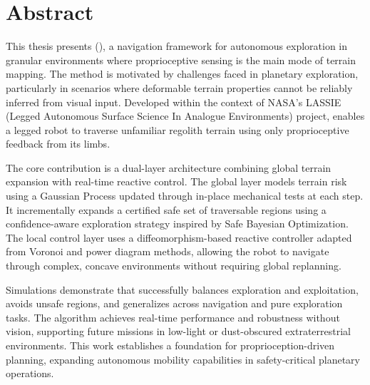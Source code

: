 \chapter*{Abstract}
\label{chap:Abstract}

This thesis presents \algonamefull{} (\algoname{}), a navigation framework for autonomous exploration in granular environments where proprioceptive sensing is the main mode of terrain mapping. The method is motivated by challenges faced in planetary exploration, particularly in scenarios where deformable terrain properties cannot be reliably inferred from visual input. Developed within the context of NASA’s LASSIE (Legged Autonomous Surface Science In Analogue Environments) project, \algoname{} enables a legged robot to traverse unfamiliar regolith terrain using only proprioceptive feedback from its limbs.

The core contribution is a dual-layer architecture combining global terrain expansion with real-time reactive control. The global layer models terrain risk using a Gaussian Process updated through in-place mechanical tests at each step. It incrementally expands a certified safe set of traversable regions using a confidence-aware exploration strategy inspired by Safe Bayesian Optimization. The local control layer uses a diffeomorphism-based reactive controller adapted from Voronoi and power diagram methods, allowing the robot to navigate through complex, concave environments without requiring global replanning.

Simulations demonstrate that \algoname{} successfully balances exploration and exploitation, avoids unsafe regions, and generalizes across navigation and pure exploration tasks. The algorithm achieves real-time performance and robustness without vision, supporting future missions in low-light or dust-obscured extraterrestrial environments. This work establishes a foundation for proprioception-driven planning, expanding autonomous mobility capabilities in safety-critical planetary operations.
